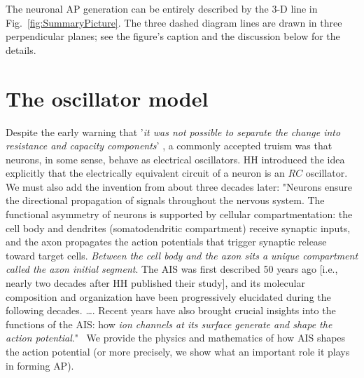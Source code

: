 The neuronal \gls{AP} generation can be entirely described  
by the 3-D line in 
Fig.~\ref{fig:SummaryPicture}. The three dashed diagram lines are drawn in 
three perpendicular planes; see the figure's caption and the discussion below for the details.


\section{The oscillator model\label{sec:OscillatorModel}}

Despite the early warning that '\textit{it was not possible to separate the change into
	resistance and capacity components}' \cite{COLE_CURTIS_IMPEDANCE:1939},
a commonly accepted truism was that neurons, in some sense, behave
as electrical oscillators.
\gls{HH} introduced the idea explicitly that the electrically equivalent circuit
of a neuron is an $RC$ oscillator.
We must also add the invention from about three decades later: "Neurons ensure the directional propagation of signals throughout the nervous system.
The functional asymmetry of neurons is supported by cellular compartmentation: the cell body and dendrites (somatodendritic compartment) receive synaptic inputs,
and the axon propagates the action potentials that trigger synaptic release toward target cells.
\textit{Between the cell body and the axon sits a unique compartment called the axon initial segment}.
The \gls{AIS} was first described 50 years ago [i.e., nearly two decades after \gls{HH} published their study], and its molecular composition
and organization have been progressively elucidated during the following decades. \dots.
Recent years have also brought crucial insights into the functions of the \gls{AIS}:
how \textit{ion channels at its surface generate and shape the action potential}."~\cite{AIS_Updated_Viewpoint:2018}
We provide the physics and mathematics of how \gls{AIS} shapes
the action potential (or more precisely, we show what an important role it plays in forming \gls{AP}).

